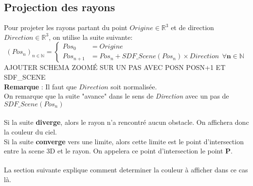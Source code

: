 \newpage
\subsection{Projection des rayons}
\label{subsec:projection}
Pour projeter les rayons partant du point $Origine\in \mathbb{R}^3$ et de direction $Direction\in \mathbb{R}^3$, on utilise la suite suivante:
$$
(Pos_n)_{n\in \mathbb{N}}=\left\{
    \begin{array}{ll}
        Pos_0 &= Origine \\
        Pos_{n+1} &= Pos_n + SDF\_Scene(Pos_n)\times Direction \ \ \mathbf{\forall n\in \mathbb{N}}
    \end{array}
\right.
$$
AJOUTER SCHEMA ZOOMÉ SUR UN PAS AVEC POSN POSN+1 ET SDF\_SCENE\\
\textbf{Remarque} : Il faut que $Direction$ soit normalisée. \\
On remarque que la suite "avance" dans le sens de \emph{Direction} avec un pas de $SDF\_Scene(Pos_n)$\\
\\
Si la suite \textbf{diverge}, alors le rayon n'a rencontré aucun obstacle. On affichera donc la couleur du ciel.\\
Si la suite \textbf{converge} vers une limite, alors cette limite est le point d'intersection entre la scene 3D et le rayon. On appelera ce point d'intersection le point \textbf{P}.\\
\\
La section suivante explique comment determiner la couleur à afficher dans ce cas là.